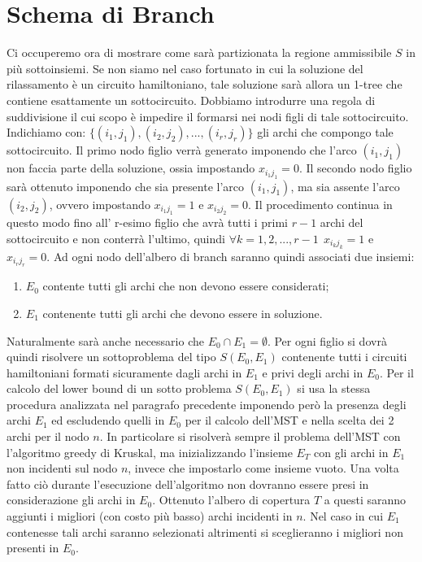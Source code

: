 \documentclass[
	article,			%
	12pt,				%
	oneside,			%
	a4paper,			%
	english,			%
	italian,				%
	sumario=tradicional,
	]{abntex2}
\begin{document}
\section{Schema di Branch}
Ci occuperemo ora di mostrare come sarà partizionata la regione ammissibile $S$ in più sottoinsiemi. Se non siamo nel caso fortunato in cui la soluzione del rilassamento è un circuito hamiltoniano, tale soluzione sarà allora un 1-tree che contiene esattamente un sottocircuito. Dobbiamo introdurre una regola di suddivisione il cui scopo è impedire il formarsi nei nodi figli di tale sottocircuito. Indichiamo con: $\{(i_1, j_1), (i_2,j_2),...,(i_r,j_r)\}$ gli archi che compongo tale sottocircuito. Il primo nodo figlio verrà generato imponendo che l'arco $(i_1,j_1)$ non faccia parte della soluzione, ossia impostando $x_{i_{1}j_{1}} = 0$. Il secondo nodo figlio sarà ottenuto imponendo che sia presente l'arco $(i_1,j_1)$, ma sia assente l'arco $(i_2,j_2)$, ovvero impostando $x_{i_{1}j_{1}} = 1$ e $x_{i_{2}j_{2}} = 0$. Il procedimento continua in questo modo fino all' r-esimo figlio che avrà tutti i primi $r-1$ archi del sottocircuito e non conterrà l'ultimo, quindi $\forall k = 1,2,...,r-1 \:\:x_{i_{k}j_{k}} = 1$ e $x_{i_{r}j_{r}} = 0$.
\newline
Ad ogni nodo dell'albero di branch saranno quindi associati due insiemi: 
\begin{enumerate}
    \item $E_0$ contente tutti gli archi che non devono essere considerati;
    \item $E_1$ contenente tutti gli archi che devono essere in soluzione.
\end{enumerate}
Naturalmente sarà anche necessario che $E_0 \cap E_1 = \emptyset$.
\newline
Per ogni figlio si dovrà quindi risolvere un sottoproblema del tipo $S(E_0, E_1)$ contenente tutti i circuiti hamiltoniani formati sicuramente dagli archi in $E_1$ e privi degli archi in $E_0$.
Per il calcolo del lower bound di un sotto problema $S(E_0, E_1)$ si usa la stessa procedura analizzata nel paragrafo precedente imponendo però la presenza degli archi $E_1$ ed escludendo quelli in $E_0$ per il calcolo dell'MST e nella scelta dei 2 archi per il nodo $n$.
In particolare si risolverà sempre il problema dell'MST con l'algoritmo greedy di Kruskal, ma inizializzando l'insieme $E_T$ con gli archi in $E_1$ non incidenti sul nodo $n$, invece che impostarlo come insieme vuoto. Una volta fatto ciò durante l'esecuzione dell'algoritmo non dovranno essere presi in considerazione gli archi in $E_0$. Ottenuto l'albero di copertura $T$ a questi saranno aggiunti i migliori (con costo più basso) archi incidenti in $n$. Nel caso in cui $E_1$ contenesse tali archi saranno selezionati altrimenti si sceglieranno i migliori non presenti in $E_0$. 
\end{document}
